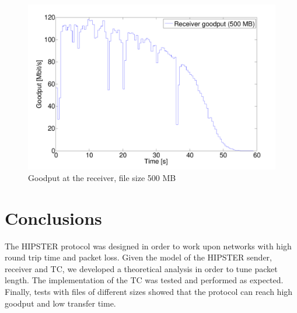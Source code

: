 \documentclass[10pt,twocolumn]{article}
\begin{document}
\begin{figure}[h]
  \centering
  \includegraphics[width = 0.95\columnwidth, keepaspectratio]{tex/images/goodput_c1_500.pdf}
  \caption{Goodput at the receiver, file size 500 MB}
  \label{fig:goodput_500}
\end{figure}

\section{Conclusions}
The HIPSTER protocol was designed in order to work upon networks with high round trip time and packet loss. Given the model of the HIPSTER sender, receiver and TC, we developed a theoretical analysis in order to tune packet length. The implementation of the TC was tested and performed as expected. Finally, tests with files of different sizes showed that the protocol can reach high goodput and low transfer time.
\end{document}
